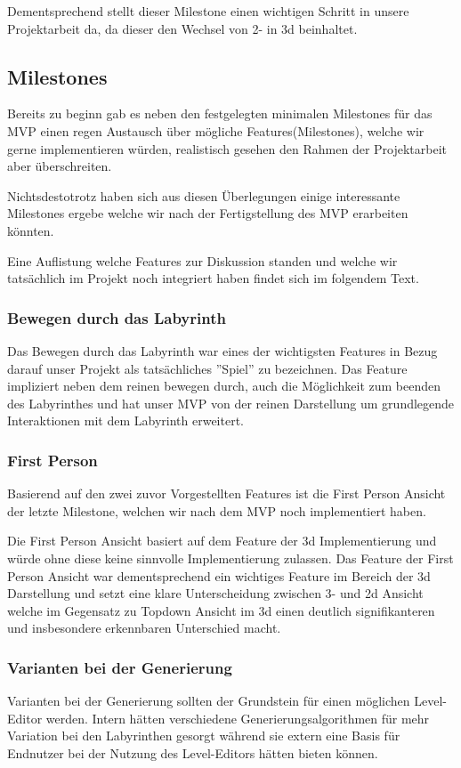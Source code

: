     	Dementsprechend stellt dieser Milestone einen wichtigen Schritt in unsere Projektarbeit da, da dieser den Wechsel von 2- in 3d beinhaltet.


\subsection{Milestones}\label{subsec:milestones}
    Bereits zu beginn gab es neben den festgelegten minimalen Milestones für das MVP einen regen Austausch über mögliche Features(Milestones), welche wir gerne implementieren würden, realistisch gesehen den Rahmen der Projektarbeit aber überschreiten.
    
    Nichtsdestotrotz haben sich aus diesen Überlegungen einige interessante Milestones ergebe welche wir nach der Fertigstellung des MVP erarbeiten könnten.
    
    Eine Auflistung welche Features zur Diskussion standen und welche wir tatsächlich im Projekt noch integriert haben findet sich im folgendem Text.


    \subsubsection*{Bewegen durch das Labyrinth}
        Das Bewegen durch das Labyrinth war eines der wichtigsten Features in Bezug darauf unser Projekt als tatsächliches ''Spiel'' zu bezeichnen. Das Feature impliziert neben dem reinen bewegen durch, auch die Möglichkeit zum beenden des Labyrinthes und hat unser MVP von der reinen Darstellung um grundlegende Interaktionen mit dem Labyrinth erweitert.

    \subsubsection*{First Person}
        Basierend auf den zwei zuvor Vorgestellten Features ist die First Person Ansicht der letzte Milestone, welchen wir nach dem MVP noch implementiert haben. 
        
        Die First Person Ansicht basiert auf dem Feature der 3d Implementierung und würde ohne diese keine sinnvolle Implementierung zulassen. Das Feature der First Person Ansicht war dementsprechend ein wichtiges Feature im Bereich der 3d Darstellung und setzt eine klare Unterscheidung zwischen 3- und 2d Ansicht welche im Gegensatz zu Topdown Ansicht im 3d einen deutlich signifikanteren und insbesondere erkennbaren Unterschied macht.    

    \subsubsection*{Varianten bei der Generierung}
        Varianten bei der Generierung sollten der Grundstein für einen möglichen Level-Editor werden. Intern hätten verschiedene Generierungsalgorithmen für mehr Variation bei den Labyrinthen gesorgt während sie extern eine Basis für Endnutzer bei der Nutzung des Level-Editors hätten bieten können.
        
